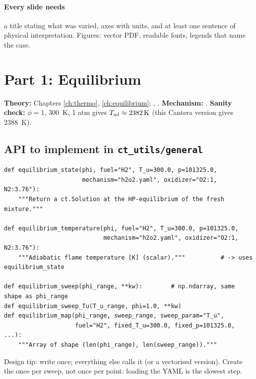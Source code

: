 \paragraph{Every slide needs} a title stating what was varied, axes with units, and at least one
sentence of physical interpretation. Figures: vector PDF, readable fonts, legends that name the case.

\section{Part 1: Equilibrium}

\textbf{Theory:} Chapters \ref{ch:thermo}, \ref{ch:equilibrium}; , .
\textbf{Mechanism:} . \textbf{Sanity check:} $\phi=1$, \SI{300}{\kelvin}, 1 atm gives $T_{\mathrm{ad}}\approx\SI{2382}{\kelvin}$
(this Cantera version gives \SI{2388}{\kelvin}).

\subsection*{API to implement in \texttt{ct\_utils/general}}
\begin{lstlisting}
def equilibrium_state(phi, fuel="H2", T_u=300.0, p=101325.0,
                      mechanism="h2o2.yaml", oxidizer="O2:1, N2:3.76"):
    """Return a ct.Solution at the HP-equilibrium of the fresh mixture."""

def equilibrium_temperature(phi, fuel="H2", T_u=300.0, p=101325.0,
                            mechanism="h2o2.yaml", oxidizer="O2:1, N2:3.76"):
    """Adiabatic flame temperature [K] (scalar)."""          # -> uses equilibrium_state

def equilibrium_sweep(phi_range, **kw):        # np.ndarray, same shape as phi_range
def equilibrium_sweep_Tu(T_u_range, phi=1.0, **kw)
def equilibrium_map(phi_range, sweep_range, sweep_param="T_u",
                    fuel="H2", fixed_T_u=300.0, fixed_p=101325.0, ...):
    """Array of shape (len(phi_range), len(sweep_range))."""
\end{lstlisting}
Design tip: write  once; everything else calls it (or a vectorised
 version). Create the  once per sweep, not once per point: loading the
YAML is the slowest step.

